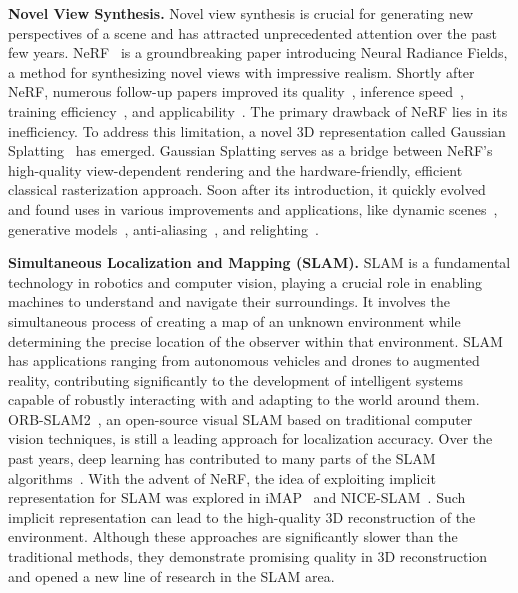 \vspace{1ex}
\noindent\textbf{Novel View Synthesis.}
Novel view synthesis is crucial for generating new perspectives of a scene and has attracted unprecedented attention over the past few years. NeRF~\citep{mildenhall2020nerf} is a groundbreaking paper introducing Neural Radiance Fields, a method for synthesizing novel views with impressive realism. Shortly after NeRF, numerous follow-up papers improved its quality~\citep{Barron_2021_ICCV, hu2023tri}, inference speed~\citep{fridovich2022plenoxels, garbin2021fastnerf}, training efficiency~\citep{sun2022direct, muller2022instant}, and applicability~\citep{meshry2019neural, park2021nerfies, chan2022efficient}. The primary drawback of NeRF lies in its inefficiency. To address this limitation, a novel 3D representation called Gaussian Splatting~\citep{kerbl20233d} has emerged. Gaussian Splatting serves as a bridge between NeRF's high-quality view-dependent rendering and the hardware-friendly, efficient classical rasterization approach. Soon after its introduction, it quickly evolved and found uses in various improvements and applications, like dynamic scenes~\citep{luiten2023dynamic,yang2023deformable}, generative models~\citep{chen2023text,tang2023dreamgaussian}, anti-aliasing~\citep{yu2023mip}, and relighting~\citep{gao2023relightable}.

\vspace{1ex}
\noindent\textbf{Simultaneous Localization and Mapping (SLAM).} SLAM is a fundamental technology in robotics and computer vision, playing a crucial role in enabling machines to understand and navigate their surroundings. It involves the simultaneous process of creating a map of an unknown environment while determining the precise location of the observer within that environment. SLAM has applications ranging from autonomous vehicles and drones to augmented reality, contributing significantly to the development of intelligent systems capable of robustly interacting with and adapting to the world around them. ORB-SLAM2~\citep{mur2017orb}, an open-source visual SLAM based on traditional computer vision techniques, is still a leading approach for localization accuracy. Over the past years, deep learning has contributed to many parts of the SLAM algorithms~\citep{mokssit2023deep}. With the advent of NeRF, the idea of exploiting implicit representation for SLAM was explored in iMAP~\citep{sucar2021imap} and NICE-SLAM~\citep{zhu2022nice}. Such implicit representation can lead to the high-quality 3D reconstruction of the environment. Although these approaches are significantly slower than the traditional methods, they demonstrate promising quality in 3D reconstruction and opened a new line of research in the SLAM area.

